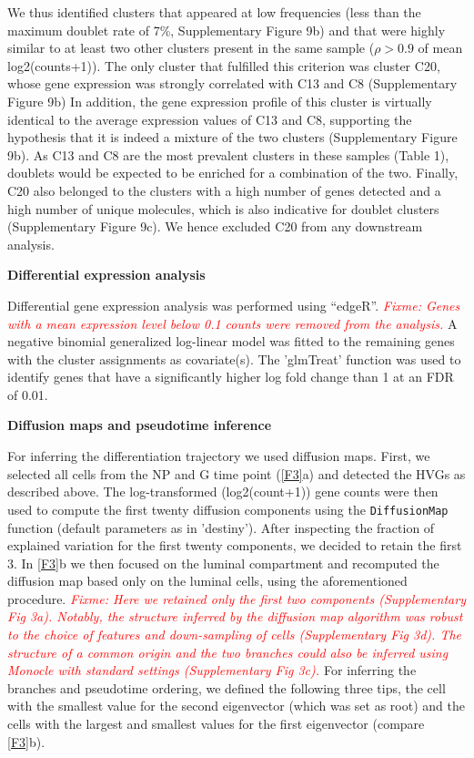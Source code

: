 \documentclass[titlepage, 12pt, oneside]{amsart}
\newcommand{\fixme}[1]{\textit{\textcolor{red}{Fixme: #1}}}
\begin{document}
We thus identified clusters that appeared at low frequencies (less than the maximum doublet rate of 7\%, Supplementary Figure 9b) and that were highly similar to at least two other clusters present in the same sample ($\rho > 0.9$ of mean log2(counts+1)).
The only cluster that fulfilled this criterion was cluster C20, whose gene expression was strongly correlated with C13 and C8 (Supplementary Figure 9b)
In addition, the gene expression profile of this cluster is virtually identical to the average expression values of C13 and C8, supporting the hypothesis that it is indeed a mixture of the two clusters (Supplementary Figure 9b).
As C13 and C8 are the most prevalent clusters in these samples (Table 1), doublets would be expected to be enriched for a combination of the two.
Finally, C20 also belonged to the clusters with a high number of genes detected and a high number of unique molecules, which is also indicative for doublet clusters (Supplementary Figure 9c).
We hence excluded C20 from any downstream analysis.

\textbf{Differential expression analysis }

Differential gene expression analysis was performed using ``edgeR''\autocite{Robinson2010}.
\fixme{Genes with a mean expression level below 0.1 counts were removed from the analysis.}
A negative binomial generalized log-linear model was fitted to the remaining genes with the cluster assignments as covariate(s).
The 'glmTreat' function was used to identify genes that have a significantly higher log fold change than 1 at an FDR of 0.01.

\textbf{Diffusion maps and pseudotime inference}

For inferring the differentiation trajectory we used diffusion maps.
First, we selected all cells from the NP and G time point (\autoref{F3}a) and detected the HVGs as described above.
The log-transformed (log2(count+1)) gene counts were then used to compute the first twenty diffusion components using the \texttt{DiffusionMap} function (default parameters as in 'destiny'\autocite{Angerer2016}).
After inspecting the fraction of explained variation for the first twenty components, we decided to retain the first 3.
In \autoref{F3}b we then focused on the luminal compartment and recomputed the diffusion map based only on the luminal cells, using the aforementioned procedure.
\fixme{Here we retained only the first two components (Supplementary Fig 3a).
Notably, the structure inferred by the diffusion map algorithm was robust to the choice of features and down-sampling of cells (Supplementary Fig 3d).
The structure of a common origin and the two branches could also be inferred using Monocle with standard settings\autocite{Trapnell2014} (Supplementary Fig 3c).
}
For inferring the branches and pseudotime ordering, we defined the following three tips, the cell with the smallest value for the second eigenvector (which was set as root) and the cells with the largest and smallest values for the first eigenvector (compare \autoref{F3}b).  
\end{document}

